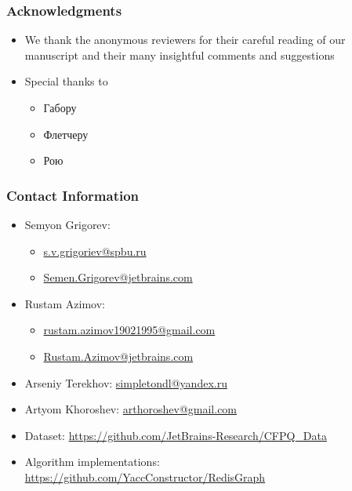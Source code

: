 \documentclass[xcolor=table]{beamer}
\begin{document}
\begin{frame}
\frametitle{Acknowledgments}
\begin{itemize}
	\item We thank the anonymous reviewers for their careful reading of our manuscript and their many insightful comments and suggestions
	\item Special thanks to
	\begin{itemize}
		\item Габору 
		\item Флетчеру 
		\item Рою 
	\end{itemize}
\end{itemize}
\end{frame}

\begin{frame}
\frametitle{Contact Information}
\begin{itemize}
  \item Semyon Grigorev:
    \begin{itemize}
      \item \href{mailto:s.v.grigoriev@spbu.ru}{s.v.grigoriev@spbu.ru}
      \item \href{mailto:Semen.Grigorev@jetbrains.com}{Semen.Grigorev@jetbrains.com}
    \end{itemize}
  \item Rustam Azimov:
  \begin{itemize}
  	\item \href{mailto:rustam.azimov19021995@gmail.com}{rustam.azimov19021995@gmail.com}
  	\item \href{mailto:Rustam.Azimov@jetbrains.com}{Rustam.Azimov@jetbrains.com}
  \end{itemize}
  \item Arseniy Terekhov: \href{mailto:simpletondl@yandex.ru}{simpletondl@yandex.ru}
  \item Artyom Khoroshev: \href{mailto:arthoroshev@gmail.com}{arthoroshev@gmail.com}
\vspace{0.5cm}
  \item Dataset: \href{https://github.com/JetBrains-Research/CFPQ_Data}{https://github.com/JetBrains-Research/CFPQ\_Data}
   \item Algorithm implementations: \href{https://github.com/YaccConstructor/RedisGraph}{https://github.com/YaccConstructor/RedisGraph}
\end{itemize}
\vspace{0.1cm}
\end{frame}
\end{document}
